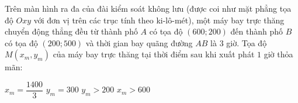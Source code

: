 \begin{ex}%
	Trên màn hình ra đa của đài kiểm soát không lưu (được coi như mặt phẳng tọa độ $ Oxy $ với đơn vị trên các trục tính theo ki-lô-mét), một máy bay trực thăng chuyển động thẳng đều từ thành phố $ A $ có tọa độ $ (600;200) $ đến thành phố $ B $ có tọa độ $ (200;500) $ và thời gian bay quãng đường $ AB $ là $ 3 $ giờ. Tọa độ $M(x_m,y_m)$ của máy bay trực thăng tại thời điểm sau khi xuất phát  $ 1 $ giờ thỏa mãn:
	\begin{choiceTF}
		{\True $x_m=\dfrac{1400}{3}$} 
		{\True  $y_m=300$}
		{\True $y_m > 200$ } 
		{$x_m  > 600$ }
	\end{choiceTF}
\end{ex}

